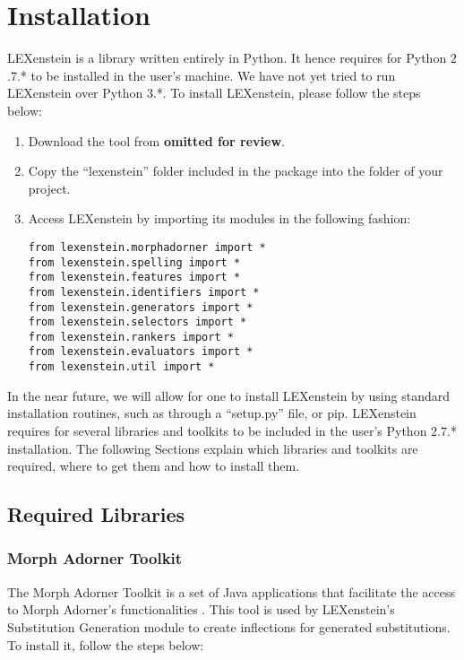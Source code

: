 \chapter{Installation}
\label{install}

LEXenstein is a library written entirely in Python. It hence requires for Python $2$.$7$.* to be installed in the user's machine. We have not yet tried to run LEXenstein over Python $3$.*. To install LEXenstein, please follow the steps below:

\begin{enumerate}
	\item Download the tool from \textbf{omitted for review}.
	\item Copy the ``lexenstein'' folder included in the package into the folder of your project.
	\item Access LEXenstein by importing its modules in the following fashion:
	\begin{lstlisting}
from lexenstein.morphadorner import *
from lexenstein.spelling import *
from lexenstein.features import *
from lexenstein.identifiers import *
from lexenstein.generators import *
from lexenstein.selectors import *
from lexenstein.rankers import *
from lexenstein.evaluators import *
from lexenstein.util import *
\end{lstlisting}
\end{enumerate}

In the near future, we will allow for one to install LEXenstein by using standard installation routines, such as through a ``setup.py'' file, or pip. LEXenstein requires for several libraries and toolkits to be included in the user's Python $2$.$7$.* installation. The following Sections explain which libraries and toolkits are required, where to get them and how to install them.






\section{Required Libraries}

\subsection{Morph Adorner Toolkit}

The Morph Adorner Toolkit \cite{Paetzold15mat} is a set of Java applications that facilitate the access to Morph Adorner's functionalities \cite{morphadorner}. This tool is used by LEXenstein's Substitution Generation module to create inflections for generated substitutions. To install it, follow the steps below:

